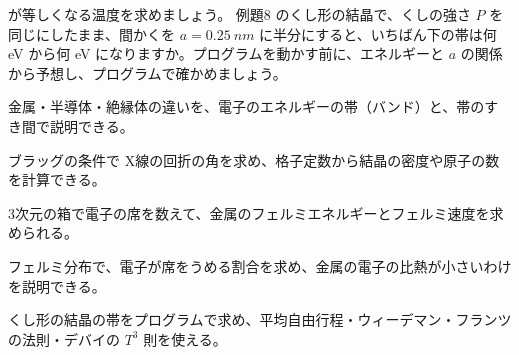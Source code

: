 が等しくなる温度を求めましょう。
\bkproblem 例題8 のくし形の結晶で、くしの強さ $P$ を同じにしたまま、間かくを $a=\qty{0.25}{nm}$ に半分にすると、いちばん下の帯は何 eV から何 eV になりますか。プログラムを動かす前に、エネルギーと $a$ の関係から予想し、プログラムで確かめましょう。

\begin{furikaeri}
\begin{checklist}
\item 金属・半導体・絶縁体の違いを、電子のエネルギーの帯（バンド）と、帯のすき間で説明できる。
\item ブラッグの条件で X線の回折の角を求め、格子定数から結晶の密度や原子の数を計算できる。
\item 3次元の箱で電子の席を数えて、金属のフェルミエネルギーとフェルミ速度を求められる。
\item フェルミ分布で、電子が席をうめる割合を求め、金属の電子の比熱が小さいわけを説明できる。
\item くし形の結晶の帯をプログラムで求め、平均自由行程・ウィーデマン・フランツの法則・デバイの $T^3$ 則を使える。
\end{checklist}
\end{furikaeri}
